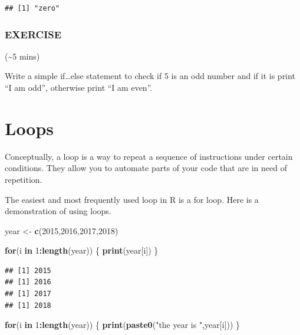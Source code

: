 \documentclass[]{book}
\newenvironment{Shaded}{\begin{snugshade}}{\end{snugshade}}
\newcommand{\ControlFlowTok}[1]{\textcolor[rgb]{0.13,0.29,0.53}{\textbf{#1}}}
\newcommand{\DecValTok}[1]{\textcolor[rgb]{0.00,0.00,0.81}{#1}}
\newcommand{\KeywordTok}[1]{\textcolor[rgb]{0.13,0.29,0.53}{\textbf{#1}}}
\newcommand{\NormalTok}[1]{#1}
\newcommand{\OperatorTok}[1]{\textcolor[rgb]{0.81,0.36,0.00}{\textbf{#1}}}
\newcommand{\StringTok}[1]{\textcolor[rgb]{0.31,0.60,0.02}{#1}}
\begin{document}
\begin{verbatim}
## [1] "zero"
\end{verbatim}

\hypertarget{exercise-12}{%
\subsubsection*{EXERCISE}\label{exercise-12}}

(\textasciitilde{}5 mins)

Write a simple if\ldots{}else statement to check if 5 is an odd number and if it is print ``I am odd'', otherwise print ``I am even''.

\hypertarget{loops}{%
\section{Loops}\label{loops}}

Conceptually, a loop is a way to repeat a sequence of instructions under certain conditions. They allow you to automate parts of your code that are in need of repetition.

The easiest and most frequently used loop in R is a for loop. Here is a demonstration of using loops.

\begin{Shaded}
\begin{Highlighting}[]
\NormalTok{year <-}\StringTok{ }\KeywordTok{c}\NormalTok{(}\DecValTok{2015}\NormalTok{,}\DecValTok{2016}\NormalTok{,}\DecValTok{2017}\NormalTok{,}\DecValTok{2018}\NormalTok{)}

\ControlFlowTok{for}\NormalTok{(i }\ControlFlowTok{in} \DecValTok{1}\OperatorTok{:}\KeywordTok{length}\NormalTok{(year)) \{}
  \KeywordTok{print}\NormalTok{(year[i])}
\NormalTok{\}}
\end{Highlighting}
\end{Shaded}

\begin{verbatim}
## [1] 2015
## [1] 2016
## [1] 2017
## [1] 2018
\end{verbatim}

\begin{Shaded}
\begin{Highlighting}[]
\ControlFlowTok{for}\NormalTok{(i }\ControlFlowTok{in} \DecValTok{1}\OperatorTok{:}\KeywordTok{length}\NormalTok{(year)) \{}
  \KeywordTok{print}\NormalTok{(}\KeywordTok{paste0}\NormalTok{(}\StringTok{"the year is "}\NormalTok{,year[i]))}
\NormalTok{\}}
\end{Highlighting}
\end{Shaded}
\end{document}
